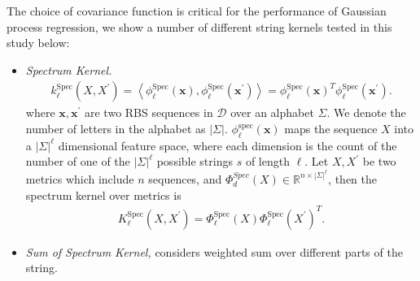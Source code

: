 The choice of covariance function is critical for the performance of Gaussian process regression, we show a number of different string kernels tested in this study below:

\begin{itemize}
    \item \textit{Spectrum Kernel.}
    \begin{align}
        k_\ell^{\text{Spec}}(X, X^\prime) =\left\langle\phi_{\ell}^{\mathrm{Spec}}(\mathbf{x}), \phi_{\ell}^{\mathrm{Spec}}\left(\mathbf{x}^{\prime}\right)\right\rangle = \phi_{\ell}^{\mathrm{Spec}}(\mathbf{x})^T \phi_{\ell}^{\mathrm{Spec}}\left(\mathbf{x}^{\prime}\right).
    \end{align}
     where $\mathbf{x}, \mathbf{x}^\prime$ are two RBS sequences in $\mathcal{D}$ over an alphabet $\Sigma$. We denote the number of letters in the alphabet as $|\Sigma|$. 
    $\phi_{\ell}^{\mathrm{spec}}(\mathbf{x})$ maps the sequence $X$ into a $|\Sigma|^\ell$ dimensional feature space, where each dimension is the count of the number of one of the $|\Sigma|^\ell$ possible strings $s$ of length $\ell$. 
    Let $X, X^\prime$ be two metrics which include $n$ sequences, and $\Phi_d^{Spec}(X) \in \mathbb{R}^{n \times |\Sigma|^{\ell}}$, then the spectrum kernel over metrics is 
    \begin{align}
         K_\ell^{\text{Spec}}(X, X^\prime) = \Phi_{\ell}^{\mathrm{Spec}}(X) \Phi_{\ell}^{\mathrm{Spec}}\left(X^{\prime}\right)^T.
    \end{align}
    
    \item \textit{Sum of Spectrum Kernel,} considers weighted sum over different parts of the string. 
    

\end{itemize}
